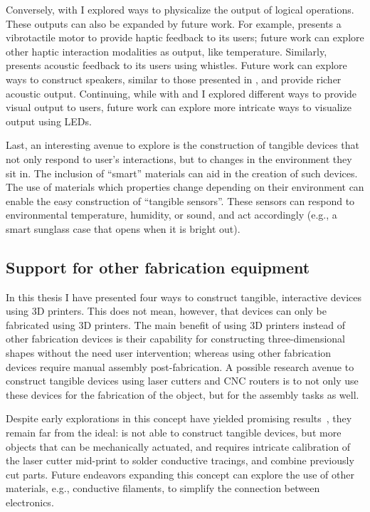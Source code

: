       Conversely, with \al I explored ways to physicalize the output of logical
      operations. These outputs can also be expanded by future work. For
      example, \al presents a vibrotactile motor to provide haptic feedback to
      its users; future work can explore other haptic interaction modalities as
      output, like temperature. Similarly, \al presents acoustic feedback to its
      users using whistles. Future work can explore \pap ways to construct
      speakers, similar to those presented in \cite{Ishiguro:2014}, and provide
      richer acoustic output. Continuing, while with \al and \mp I explored
      different ways to provide visual output to users, future work can explore
      more intricate ways to visualize output using LEDs.
      
      Last, an interesting avenue to explore is the construction of tangible
      devices that not only respond to user's interactions, but to changes in
      the environment they sit in. The inclusion of ``smart'' materials can aid
      in the creation of such devices. The use of materials which properties
      change depending on their environment can enable the easy construction of
      ``tangible sensors''. These sensors can respond to environmental
      temperature, humidity, or sound, and act accordingly (e.g., a smart
      sunglass case that opens when it is bright out).

    \newpage
    \subsection{Support for other fabrication equipment}
      In this thesis I have presented four \pap ways to construct tangible,
      interactive devices using 3D printers. This does not mean, however, that
      \pap devices can only be fabricated using 3D printers. The main benefit of
      using 3D printers instead of other fabrication devices is their capability
      for constructing three-dimensional shapes without the need user
      intervention; whereas using other fabrication devices require manual
      assembly post-fabrication. A possible research avenue to construct
      tangible devices using laser cutters and CNC routers is to not only use
      these devices for the fabrication of the object, but for the assembly
      tasks as well.

      Despite early explorations in this concept have yielded promising
      results~\cite{Katakura:2019, Nisser:2021}, they remain far from the \papf
      ideal: \cite{Katakura:2019} is not able to construct tangible devices, but
      more objects that can be mechanically actuated, and \cite{Nisser:2021}
      requires intricate calibration of the laser cutter mid-print to solder
      conductive tracings, and combine previously cut parts. Future endeavors
      expanding this concept can explore the use of other materials, e.g.,
      conductive filaments, to simplify the connection between electronics.
